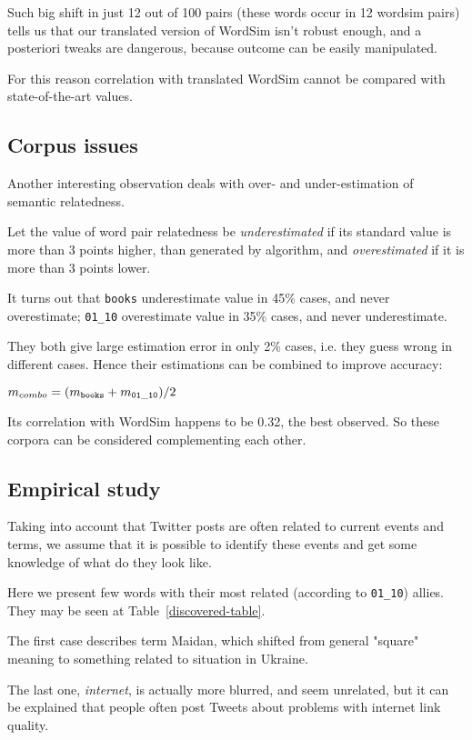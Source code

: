 \documentclass[11pt,letterpaper]{article}
\begin{document}
Such big shift in just 12 out of 100 pairs (these words occur in 12 wordsim pairs) 
tells us that our translated version
of WordSim isn't robust enough, and a posteriori tweaks are dangerous, because
outcome can be easily manipulated. 

For this reason correlation with translated WordSim cannot be compared with
state-of-the-art values. 

\subsection{Corpus issues}

Another interesting observation deals with over- and under-estimation of 
semantic relatedness. 

Let the value of word pair relatedness be {\em underestimated} if its standard value is more than 
3 points higher, than generated by algorithm, and {\em overestimated} if it is more than 3 points  
lower.

It turns out that {\tt books} underestimate value in 45\% cases, and never overestimate;
{\tt 01\_10} overestimate value in 35\% cases, and never underestimate. 

They both give large estimation error in only 2\% cases, i.e. they guess wrong in different cases.
Hence their estimations can be combined to improve accuracy:

$m_{combo} = (m_{\tt books} + m_{\tt 01\_10}) / 2 $

Its correlation with WordSim happens to be 0.32, the best observed.
So these corpora can be considered complementing each other.

\subsection{Empirical study}

Taking into account that Twitter posts are often
related to current events and terms, we assume that it is possible to identify
these events and get some knowledge of what do they look like.

Here we present few words with their most related (according to {\tt 01\_10}) allies.
They may be seen at Table~\ref{discovered-table}.

The first case describes term Maidan, which shifted from general "square" meaning
to something related to situation in Ukraine. 

The last one, {\em internet}, is actually more blurred, and seem unrelated, but it can
be explained that people often post Tweets about problems with internet link quality.
\end{document}
